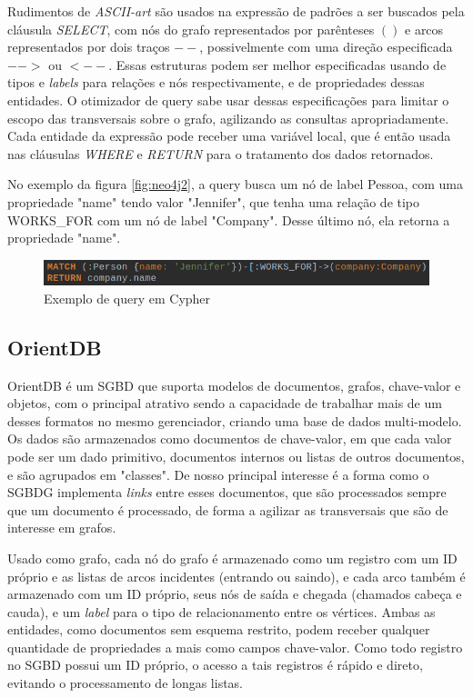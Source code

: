\documentclass[conference]{IEEEtran}
\begin{document}
Rudimentos de \emph{ASCII-art} são usados na expressão de padrões a ser buscados pela cláusula \emph{SELECT}, com nós do grafo representados por parênteses $()$ e arcos representados por dois traços $--$, possivelmente com uma direção especificada $-->$ ou $<--$. Essas estruturas podem ser melhor especificadas usando de tipos e \emph{labels} para relações e nós respectivamente, e de propriedades dessas entidades. O otimizador de query sabe usar dessas especificações para limitar o escopo das transversais sobre o grafo, agilizando as consultas apropriadamente. Cada entidade da expressão pode receber uma variável local, que é então usada nas cláusulas \emph{WHERE} e \emph{RETURN} para o tratamento dos dados retornados.

No exemplo da figura \ref{fig:neo4j2}, a query busca um nó de label Pessoa, com uma propriedade "name" tendo valor "Jennifer", que tenha uma relação de tipo WORKS\_FOR com um nó de label "Company". Desse último nó, ela retorna a propriedade "name".

\begin{figure}[htbp]
\centerline{\includegraphics[width=0.9\linewidth]{neo4j_ps2.png}}
\caption{Exemplo de query em Cypher}\label{fig:neo4j2}
\label{fig}
\end{figure}

\subsection{OrientDB}

OrientDB é um SGBD que suporta modelos de documentos, grafos, chave-valor e objetos, com o principal atrativo sendo a capacidade de trabalhar mais de um desses formatos no mesmo gerenciador, criando uma base de dados multi-modelo. Os dados são armazenados como documentos de chave-valor, em que cada valor pode ser um dado primitivo, documentos internos ou listas de outros documentos, e são agrupados em "classes". De nosso principal interesse é a forma como o SGBDG implementa \emph{links} entre esses documentos, que são processados sempre que um documento é processado, de forma a agilizar as transversais que são de interesse em grafos.

Usado como grafo, cada nó do grafo é armazenado como um registro com um ID próprio e as listas de arcos incidentes (entrando ou saindo), e cada arco também é armazenado com um ID próprio, seus nós de saída e chegada (chamados cabeça e cauda), e um \emph{label} para o tipo de relacionamento entre os vértices. Ambas as entidades, como documentos sem esquema restrito, podem receber qualquer quantidade de propriedades a mais como campos chave-valor. Como todo registro no SGBD possui um ID próprio, o acesso a tais registros é rápido e direto, evitando o processamento de longas listas.
\end{document}
